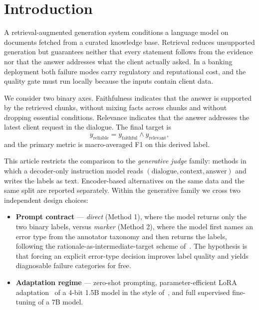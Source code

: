 \documentclass{zapiski}
\begin{document}

\maketitle

\section{Introduction}
\label{sec:introduction}

A retrieval-augmented generation system conditions a language model on
documents fetched from a curated knowledge base. Retrieval reduces unsupported
generation but guarantees neither that every statement follows from the
evidence nor that the answer addresses what the client actually asked. In a
banking deployment both failure modes carry regulatory and reputational cost,
and the quality gate must run locally because the inputs contain client data.

We consider two binary axes. Faithfulness indicates that the answer is
supported by the retrieved chunks, without mixing facts across chunks and
without dropping essential conditions. Relevance indicates that the answer
addresses the latest client request in the dialogue. The final target is
\begin{equation}
 y_{\mathrm{reliable}} = y_{\mathrm{faithful}} \land y_{\mathrm{relevant}},
 \label{eq:reliability}
\end{equation}
and the primary metric is macro-averaged F1 on this derived label.

This article restricts the comparison to the \emph{generative judge} family:
methods in which a decoder-only instruction model reads
$(\mathrm{dialogue}, \mathrm{context}, \mathrm{answer})$ and writes the labels
as text. Encoder-based alternatives on the same data and the same split are
reported separately. Within the generative family we cross two independent
design choices:

\begin{itemize}
 \item \textbf{Prompt contract} --- \emph{direct} (Method 1), where the model
 returns only the two binary labels, versus \emph{marker} (Method 2), where
 the model first names an error type from the annotator taxonomy and then
 returns the labels, following the rationale-as-intermediate-target scheme
 of~\cite{hsieh2023distilling}. The hypothesis is that forcing an explicit
 error-type decision improves label quality and yields diagnosable failure
 categories for free.
 \item \textbf{Adaptation regime} --- zero-shot prompting, parameter-efficient
 LoRA adaptation~\cite{hu2021lora} of a 4-bit 1.5B model in the style
 of~\cite{dettmers2023qlora}, and full supervised fine-tuning of a 7B model.
\end{itemize}
\end{document}
